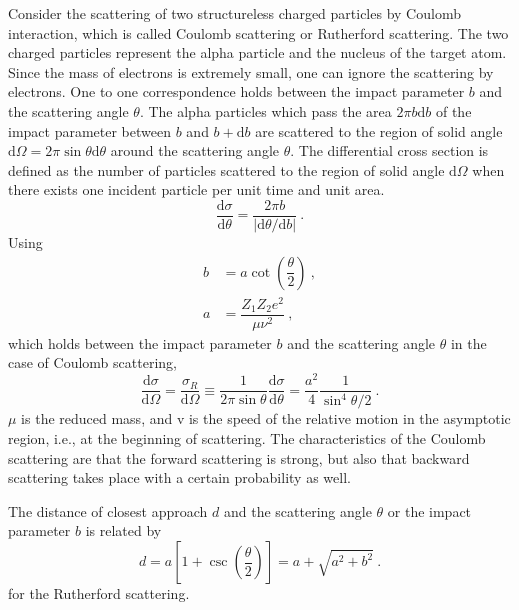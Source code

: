 \documentclass[12pt,a4paper]{article}
\newcommand{\dif}{\mathrm{d}}
\begin{document}
Consider the scattering of two structureless charged particles by Coulomb interaction, which is called Coulomb scattering or Rutherford scattering. The two charged particles represent the alpha particle and the nucleus of the target atom. Since the mass of electrons is extremely small, one can ignore the scattering by electrons. One to one correspondence holds between the impact parameter $b$ and the scattering angle $\theta$. The alpha particles which pass the area $2\pi b\dif b$ of the impact parameter between $b$ and $b + \dif b$ are scattered to the region of solid angle $\dif \Omega = 2\pi \sin \theta \dif \theta$ around the scattering angle $\theta$. The differential cross section is defined as the number of particles scattered to the region of solid angle $\dif \Omega$ when there exists one incident particle per unit time and unit area. 
\begin{equation}
\dfrac{\dif \sigma}{\dif \theta} = \dfrac{2\pi b}{|\dif \theta/\dif b|} ~.
\end{equation}
Using 
\begin{align}
b &= a \cot \left(\dfrac{\theta}{2} \right) ~, \\
a &= \dfrac{Z_1 Z_2 e^2}{\mu \nu^2} ~,
\end{align}
which holds between the impact parameter $b$ and the scattering angle $\theta$ in the case of Coulomb scattering, 
\begin{equation}
\dfrac{\dif \sigma}{\dif \Omega} = \dfrac{\sigma_R}{\dif \Omega} \equiv \dfrac{1}{2\pi \sin \theta} \dfrac{\dif \sigma}{\dif \theta} = \dfrac{a^2}{4} \dfrac{1}{\sin^4 \theta/2} ~.
\end{equation}
$\mu$ is the reduced mass, and v is the speed of the relative motion in the asymptotic region, i.e., at the beginning of scattering. The characteristics of the Coulomb scattering are that the forward scattering is strong, but also that backward scattering takes place with a certain probability as well. 

The distance of closest approach $d$ and the scattering angle $\theta$ or the impact parameter $b$ is related by
\begin{equation}
d = a \left[1 + \csc \left(\dfrac{\theta}{2} \right) \right] = a +\sqrt{a^2 +b^2} ~.
\end{equation}
for the Rutherford scattering. 
\end{document}
